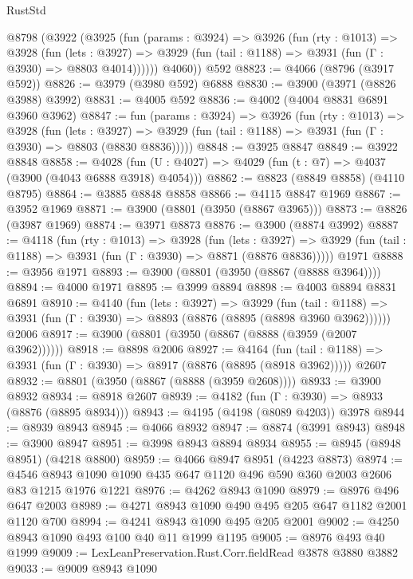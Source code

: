 \begin{lexlean}{RustStd}
\begin{coremodule}
    @8798
      (@3922
        (@3925
          (fun (params : @3924) =>
          @3926
            (fun (rty : @1013) =>
            @3928
              (fun (lets : @3927) =>
              @3929 (fun (tail : @1188) => @3931 (fun (Γ : @3930) => @8803 @4014))))))
        @4060))
    @592
@8823 := @4066 (@8796 (@3917 @592))
@8826 := @3979 (@3980 @592) @6888
@8830 := @3900 (@3971 (@8826 @3988) @3992)
@8831 := @4005 @592
@8836 := @4002 (@4004 @8831 @6891 @3960 @3962)
@8847 := fun (params : @3924) =>
  @3926
    (fun (rty : @1013) =>
    @3928
      (fun (lets : @3927) =>
      @3929 (fun (tail : @1188) => @3931 (fun (Γ : @3930) => @8803 (@8830 @8836)))))
@8848 := @3925 @8847
@8849 := @3922 @8848
@8858 := @4028 (fun (U : @4027) => @4029 (fun (t : @7) => @4037 (@3900 (@4043 @6888 @3918) @4054)))
@8862 := @8823 (@8849 @8858) (@4110 @8795)
@8864 := @3885 @8848 @8858
@8866 := @4115 @8847 @1969
@8867 := @3952 @1969
@8871 := @3900 (@8801 (@3950 (@8867 @3965)))
@8873 := @8826 (@3987 @1969)
@8874 := @3971 @8873
@8876 := @3900 (@8874 @3992)
@8887 := @4118
    (fun (rty : @1013) =>
    @3928
      (fun (lets : @3927) =>
      @3929 (fun (tail : @1188) => @3931 (fun (Γ : @3930) => @8871 (@8876 @8836)))))
    @1971
@8888 := @3956 @1971
@8893 := @3900 (@8801 (@3950 (@8867 (@8888 @3964))))
@8894 := @4000 @1971
@8895 := @3999 @8894
@8898 := @4003 @8894 @8831 @6891
@8910 := @4140
    (fun (lets : @3927) =>
    @3929
      (fun (tail : @1188) => @3931 (fun (Γ : @3930) => @8893 (@8876 (@8895 (@8898 @3960 @3962))))))
    @2006
@8917 := @3900 (@8801 (@3950 (@8867 (@8888 (@3959 (@2007 @3962))))))
@8918 := @8898 @2006
@8927 := @4164
    (fun (tail : @1188) => @3931 (fun (Γ : @3930) => @8917 (@8876 (@8895 (@8918 @3962)))))
    @2607
@8932 := @8801 (@3950 (@8867 (@8888 (@3959 @2608))))
@8933 := @3900 @8932
@8934 := @8918 @2607
@8939 := @4182 (fun (Γ : @3930) => @8933 (@8876 (@8895 @8934)))
@8943 := @4195 (@4198 (@8089 @4203)) @3978
@8944 := @8939 @8943
@8945 := @4066 @8932
@8947 := @8874 (@3991 @8943)
@8948 := @3900 @8947
@8951 := @3998 @8943 @8894 @8934
@8955 := @8945 (@8948 @8951) (@4218 @8800)
@8959 := @4066 @8947 @8951 (@4223 @8873)
@8974 := @4546 @8943 @1090 @1090 @435 @647 @1120 @496 @590 @360 @2003 @2606 @83 @1215 @1976 @1221
@8976 := @4262 @8943 @1090
@8979 := @8976 @496 @647 @2003
@8989 := @4271 @8943 @1090 @490 @495 @205 @647 @1182 @2001 @1120 @700
@8994 := @4241 @8943 @1090 @495 @205 @2001
@9002 := @4250 @8943 @1090 @493 @100 @40 @11 @1999 @1195
@9005 := @8976 @493 @40 @1999
@9009 := LexLeanPreservation.Rust.Corr.fieldRead @3878 @3880 @3882
@9033 := @9009
    @8943
    @1090

\end{coremodule}
\end{lexlean}

